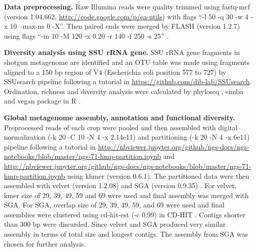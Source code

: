 \documentclass[]{msu-thesis}
\begin{document}
\textbf{Data preprocessing. }
Raw Illumina reads were quality trimmed using fastq-mcf (version 1.04.662, \url{http://code.google.com/p/ea-utils}) with flags ``-l 50 -q 30 -w 4 -x 10 –max-ns 0 -X''. Then paired ends were merged by FLASH (version 1.2.7) \cite{magoc_flash:_2011} using flags ``-m 10 -M 120 -x 0.20 -r 140 -f 250 -s 25'' \cite{guo_microbial_2015}.

\textbf{Diversity analysis using SSU rRNA gene. }
SSU rRNA gene fragments in shotgun metagenome are identified and an OTU table was made using fragments aligned to a 150 bp region of V4 (Escherichia coli position 577 to 727) by SSUsearch pipeline \cite{guo_microbial_2015} following a tutorial in \url{https://github.com/dib-lab/SSUsearch}. Ordination, richness and diversity analysis were calculated by phyloseq \cite{mcmurdie_phyloseq:_2013}, simba \cite{jurasinski_simba:_2012} and vegan \cite{oksanen_vegan:_2015} package in R \cite{r_core_team_r:_2014}.

\textbf{Global metagenome assembly, annotation and functional diversity. }
Preprocessed reads of each crop were pooled and then assembled with digital normalization (-k 20 -C 10 -N 4 -x 2.14e11) and partitioning (-k 20 -N 4 -x 6e11) pipeline \cite{howe_tackling_2014} following a tutorial in \url{http://nbviewer.jupyter.org/github/ngs-docs/ngs-notebooks/blob/master/ngs-71-hmp-partition.ipynb} and \url{http://nbviewer.jupyter.org/github/ngs-docs/ngs-notebooks/blob/master/ngs-71-hmp-partition.ipynb} using khmer (version 0.6.1). The partitioned data were then assembled with velvet (version 1.2.08) \cite{zerbino_velvet:_2008} and SGA (version 0.9.35) \cite{simpson_efficient_2012}. For velvet, kmer size of 29, 39, 49, 59 and 69 were used and final assembly was merged with SGA. For SGA, overlap size of 29, 39, 49, 59, and 69 were used and final assemblies were clustered using cd-hit-est (-c 0.99) in CD-HIT \cite{li_cd-hit:_2006}. Contigs shorter than 300 bp were discarded. Since velvet and SGA produced very similar assembly in terms of total size and longest contigs. The assembly from SGA was chosen for further analysis.
\end{document}
